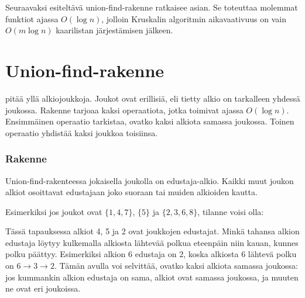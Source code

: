Seuraavaksi esiteltävä union-find-rakenne
ratkaisee asian.
Se toteuttaa molemmat funktiot
ajassa $O(\log n)$,
jolloin Kruskalin algoritmin
aikavaativuus on vain $O(m \log n)$
kaarilistan järjestämisen jälkeen.

\section{Union-find-rakenne}


 pitää yllä
alkiojoukkoja.
Joukot ovat erillisiä,
eli tietty alkio on tarkalleen
yhdessä joukossa.
Rakenne tarjoaa kaksi operaatiota,
jotka toimivat ajassa $O(\log n)$.
Ensimmäinen operaatio tarkistaa,
ovatko kaksi alkiota samassa joukossa.
Toinen operaatio yhdistää kaksi
joukkoa toisiinsa.

\subsubsection{Rakenne}

Union-find-rakenteessa jokaisella
joukolla on edustaja-alkio.
Kaikki muut joukon alkiot osoittavat
edustajaan joko suoraan tai
muiden alkioiden kautta.

Esimerkiksi jos joukot ovat
$\{1,4,7\}$, $\{5\}$ ja $\{2,3,6,8\}$,
tilanne voisi olla:
\begin{center}
\end{center}
Tässä tapauksessa alkiot 4, 5 ja 2
ovat joukkojen edustajat.
Minkä tahansa alkion edustaja
löytyy kulkemalla alkiosta lähtevää polkua
eteenpäin niin kauan, kunnes polku päättyy.
Esimerkiksi alkion 6 edustaja on 2,
koska alkiosta 6 lähtevä
polku on $6 \rightarrow 3 \rightarrow 2$.
Tämän avulla voi selvittää,
ovatko kaksi alkiota samassa joukossa:
jos kummankin alkion edustaja on sama,
alkiot ovat samassa joukossa,
ja muuten ne ovat eri joukoissa.

